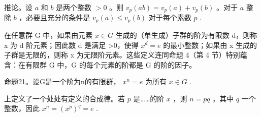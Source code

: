 推论。设 \(a\) 和 \(b\) 是两个整数 \(>0\) 。则 \(v_{p}(ab) = v_{p}(a) + v_{p}(b)\) 。对于 \(a\) 整除 \(b\) ，必要且充分的条件是 \(v_{p}(a) \leqslant v_{p}(b)\) 对于每个素数 \(p\) .

在任意群 G 中，如果由元素 \(x \in G\) 生成的（单生成）子群的阶为有限数 d，则称 x 为 d 阶元素；因此数 d 是满足 \textgreater0，使得 \(x^{d} = e\) 的最小整数；如果由 x 生成的子群是无限的，则称 x 为无限阶元素。这些定义连同命题 4（第 4 节）特别蕴含：在有限群 G 中，G 的每个元素的阶都是 G 的阶的因子。

命题21。设G是一个阶为n的有限群， \(x^{n} = e\) 为所有 \(x \in G\) .

上定义了一个处处有定义的合成律。若 \(p\) 是……的阶 \(x\) ，则 \(n = pq\) ，其中 \(q\) 一个整数，因此 \(x^n = (x^p)^q = e\) .

